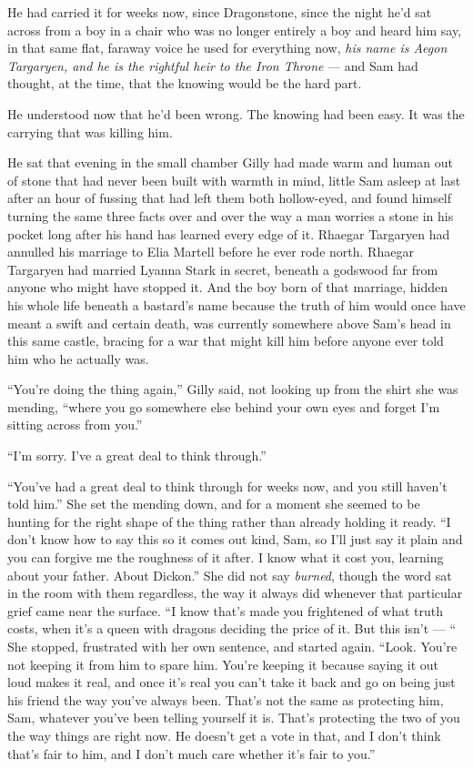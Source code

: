 He had carried it for weeks now, since Dragonstone, since the night he’d sat across from a boy in a chair who was no longer entirely a boy and heard him say, in that same flat, faraway voice he used for everything now, \textit{his name is Aegon Targaryen, and he is the rightful heir to the Iron Throne} — and Sam had thought, at the time, that the knowing would be the hard part.

He understood now that he’d been wrong. The knowing had been easy. It was the carrying that was killing him.

He sat that evening in the small chamber Gilly had made warm and human out of stone that had never been built with warmth in mind, little Sam asleep at last after an hour of fussing that had left them both hollow-eyed, and found himself turning the same three facts over and over the way a man worries a stone in his pocket long after his hand has learned every edge of it. Rhaegar Targaryen had annulled his marriage to Elia Martell before he ever rode north. Rhaegar Targaryen had married Lyanna Stark in secret, beneath a godswood far from anyone who might have stopped it. And the boy born of that marriage, hidden his whole life beneath a bastard’s name because the truth of him would once have meant a swift and certain death, was currently somewhere above Sam’s head in this same castle, bracing for a war that might kill him before anyone ever told him who he actually was.

“You’re doing the thing again,” Gilly said, not looking up from the shirt she was mending, “where you go somewhere else behind your own eyes and forget I’m sitting across from you.”

“I’m sorry. I’ve a great deal to think through.”

“You’ve had a great deal to think through for weeks now, and you still haven’t told him.” She set the mending down, and for a moment she seemed to be hunting for the right shape of the thing rather than already holding it ready. “I don’t know how to say this so it comes out kind, Sam, so I’ll just say it plain and you can forgive me the roughness of it after. I know what it cost you, learning about your father. About Dickon.” She did not say \textit{burned}, though the word sat in the room with them regardless, the way it always did whenever that particular grief came near the surface. “I know that’s made you frightened of what truth costs, when it’s a queen with dragons deciding the price of it. But this isn’t — “ She stopped, frustrated with her own sentence, and started again. “Look. You’re not keeping it from him to spare him. You’re keeping it because saying it out loud makes it real, and once it’s real you can’t take it back and go on being just his friend the way you’ve always been. That’s not the same as protecting him, Sam, whatever you’ve been telling yourself it is. That’s protecting the two of you the way things are right now. He doesn’t get a vote in that, and I don’t think that’s fair to him, and I don’t much care whether it’s fair to you.”

